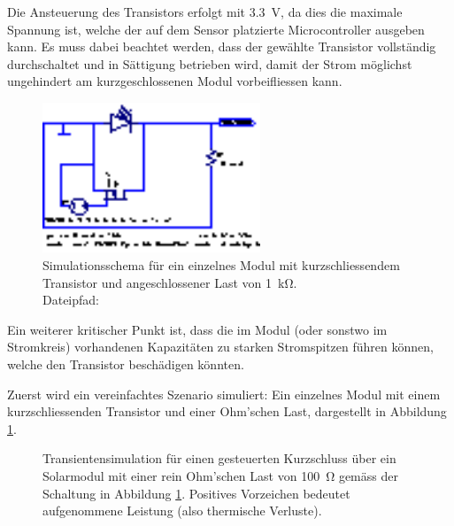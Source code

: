 Die  Ansteuerung des  Transistors  erfolgt mit  \SI{3.3}{\volt},  da dies  die
maximale Spannung  ist, welche der  auf dem Sensor  platzierte Microcontroller
ausgeben kann. Es muss  dabei beachtet werden, dass  der gew\"ahlte Transistor
vollst\"andig durchschaltet und in S\"attigung betrieben wird, damit der Strom
m\"oglichst ungehindert am kurzgeschlossenen Modul vorbeifliessen kann.

\begin{figure}
    \vspace*{-1em}
    \centering
    \includegraphics[width=65mm]{images/ltspice/jac/shortcircuit-transmitter.eps}
    \caption[-Schaltung Kurzschlussmethode, Sender, vereinfacht]{
        Simulationsschema  f\"ur  ein  einzelnes Modul  mit  kurzschliessendem
        Transistor und angeschlossener Last von \SI{1}{\kilo\ohm}.\protect\\
        Dateipfad: %
    }
    \label{fig:ltspice:shortCircuit:transmitter}
    \vspace*{-2em}
\end{figure}

Ein  weiterer  kritischer  Punkt  ist,  dass die  im  Modul  (oder sonstwo  im
Stromkreis)  vorhandenen   Kapazit\"aten  zu  starken   Stromspitzen  f\"uhren
k\"onnen, welche den Transistor besch\"adigen k\"onnten.

Zuerst wird ein vereinfachtes Szenario simuliert: Ein einzelnes Modul mit einem
kurzschliessenden Transistor und einer Ohm'schen Last, dargestellt in Abbildung
\ref{fig:ltspice:shortCircuit:transmitter}.


\begin{figure}[h!tb]
    
    \caption[Simulationsergebnisse Kurzschlussmethode, Sender]{%
        Transientensimulation    f\"ur     einen    gesteuerten    Kurzschluss
        \"uber     ein     Solarmodul     mit     einer     rein     Ohm'schen
        Last      von      \SI{100}{\ohm}     gem\"ass      der      Schaltung
        in   Abbildung   \ref{fig:ltspice:shortCircuit:transmitter}. Positives
        Vorzeichen bedeutet aufgenommene Leistung (also thermische Verluste).%
    }
    \label{fig:simu:shortCircuit:transmitter}
\end{figure}


